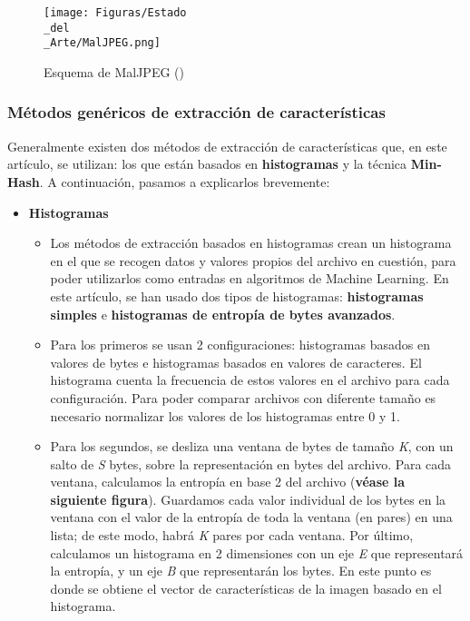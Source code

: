 \begin{figure}[H]
  \centering
  \texttt{[image: Figuras/Estado\\\_del\\\_Arte/MalJPEG.png]}
  \label{fig:MalJPEG}
  \caption{Esquema de MalJPEG (\cite{maljpeg})}
\end{figure}

\subsubsection{Métodos genéricos de extracción de características}

Generalmente existen dos métodos de extracción de características que, en este artículo, se utilizan: los que están basados en \textbf{histogramas} y la técnica \textbf{Min-Hash}. A continuación, pasamos a explicarlos brevemente:

\begin{itemize}
\item \textbf{Histogramas}
\begin{itemize}
\item Los métodos de extracción basados en histogramas crean un histograma en el que se recogen datos y valores propios del archivo en cuestión, para poder utilizarlos como entradas en algoritmos de Machine Learning. En este artículo, se han usado dos tipos de histogramas: \textbf{histogramas simples} e \textbf{histogramas de entropía de bytes avanzados}.
\item Para los primeros se usan 2 configuraciones: histogramas basados en valores de bytes e histogramas basados en valores de caracteres. El histograma cuenta la frecuencia de estos valores en el archivo para cada configuración. Para poder comparar archivos con diferente tamaño es necesario normalizar los valores de los histogramas entre 0 y 1.
\item Para los segundos, se desliza una ventana de bytes de tamaño \textit{K}, con un salto de \textit{S} bytes, sobre la representación en bytes del archivo. Para cada ventana, calculamos la entropía en base 2 del archivo (\textbf{véase la siguiente figura}). Guardamos cada valor individual de los bytes en la ventana con el valor de la entropía de toda la ventana (en pares) en una lista; de este modo, habrá \textit{K} pares por cada ventana. Por último, calculamos un histograma en 2 dimensiones con un eje \textit{E} que representará la entropía, y un eje \textit{B} que representarán los bytes. En este punto es donde se obtiene el vector de características de la imagen basado en el histograma.


\end{itemize}
\end{itemize}
